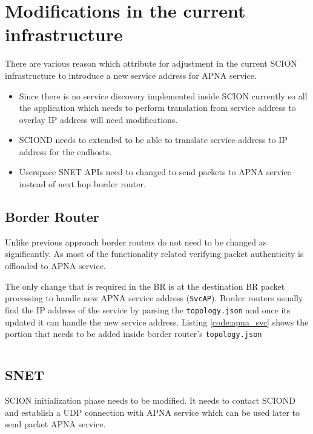 \section{Modifications in the current infrastructure} \label{srv:mod}
There are various reason which attribute for adjustment in the current SCION infrastructure to introduce a new service address for APNA service.

\begin{itemize}
    \item Since there is no service discovery implemented inside SCION currently so all the application which needs to perform translation from service address to overlay IP address will need modifications.
    \item SCIOND needs to extended to be able to translate service address to IP address for the endhosts.
    \item Userspace SNET APIs need to changed to send packets to APNA service instead of next hop border router.
\end{itemize}

\subsection{Border Router}
Unlike previous approach border routers do not need to be changed as significantly. As most of the functionality related verifying packet authenticity is offloaded to APNA service.

The only change that is required in the BR is at the destination BR packet processing to handle new APNA service address (\texttt{SvcAP}). Border routers usually find the IP address of the service by parsing the \texttt{topology.json} and once its updated it can handle the new service address. Listing \ref{code:apna_svc} shows the portion that needs to be added inside border router's \texttt{topology.json}

\begin{code}
\inputminted[frame=lines, framesep=2mm, baselinestretch=1.2, fontsize=\footnotesize, linenos]{json}{code_snippets/apnasvc.json} \label{code:apna_svc}
\end{code}

\subsection{SNET}
SCION initialization phase needs to be modified. It needs to contact SCIOND and establish a UDP connection with APNA service which can be used later to send packet APNA service.

